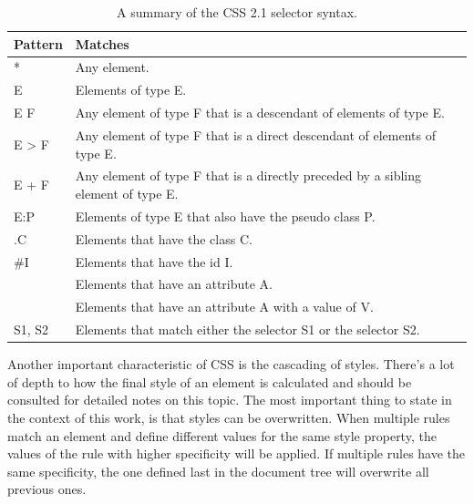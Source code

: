 \begin{table}[tp]
    \centering
    \begin{tabularx}{\linewidth}{| l | X |}
        \hline
        \textbf{Pattern} & \textbf{Matches}                                                                  \\ \hline
        *                & Any element.                                                                      \\ \hline
        E                & Elements of type E.                                                               \\ \hline
        E F              & Any element of type F that is a descendant of elements of type E.                 \\ \hline
        E > F            & Any element of type F that is a direct descendant of elements of type E.          \\ \hline
        E + F            & Any element of type F that is a directly preceded by a sibling element of type E. \\ \hline
        E:P              & Elements of type E that also have the pseudo class P.                             \\ \hline
        .C               & Elements that have the class  C.                                                  \\ \hline
        \#I              & Elements that have the id I.                                                      \\ \hline
        [A]              & Elements that have an attribute A.                                                \\ \hline
        [A=V]            & Elements that have an attribute A with a value of V.                              \\ \hline
        S1, S2           & Elements that match either the selector S1 or the selector S2.                    \\ \hline
    \end{tabularx}
    \caption[CSS 2.1 Selector Syntax]
    {
        A summary of the CSS 2.1 selector syntax.
    }
    \label{tab:CSSSelectorSyntax}
\end{table}

Another important characteristic of CSS is the cascading of styles. There's a lot of depth to how the final style of an element is calculated and \cite{CSS21} should be consulted for detailed notes on this topic. The most important thing to state in the context of this work, is that styles can be overwritten. When multiple rules match an element and define different values for the same style property, the values of the rule with higher specificity will be applied. If multiple rules have the same specificity, the one defined last in the document tree will overwrite all previous ones.


